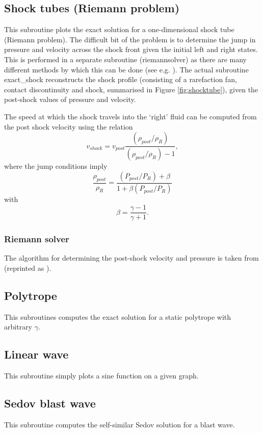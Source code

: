 \documentclass[a4paper,12pt]{article}
\begin{document}
\subsection{Shock tubes (Riemann problem)}
 This subroutine plots the exact solution for a one-dimensional shock tube
(Riemann problem). The difficult bit of the problem is to determine the jump in
pressure and velocity across the shock front given the initial left and right
states. This is performed in a separate subroutine (riemannsolver) as there are 
many different methods by which this can be done (see e.g. \citealt{toro92}). 
The actual subroutine exact\_shock reconstructs the shock profile (consisting of
a rarefaction fan, contact discontinuity and shock, summarised in Figure
\ref{fig:shocktube}), given the post-shock values of pressure and
velocity. 

 The speed at which the shock travels into the `right' fluid can be computed from the post shock
velocity using the relation
\begin{equation}
v_{shock} = v_{post}\frac{(\rho_{post}/\rho_R)}{(\rho_{post}/\rho_R)- 1},
\end{equation}
where the jump conditions imply
\begin{equation}
\frac{\rho_{post}}{\rho_R} = \frac{(P_{post}/P_R) + \beta}{1 + \beta (P_{post}/P_R)}
\end{equation}
with
\begin{equation}
\beta = \frac{\gamma - 1}{\gamma + 1}.
\end{equation}

\subsubsection{Riemann solver}
 The algorithm for determining the post-shock velocity and pressure is taken
from \citet{vanleer79} (reprinted as \citealt{vanleer99}).


\subsection{Polytrope}
 This subroutines computes the exact solution for a static polytrope with
arbitrary $\gamma$.

\subsection{Linear wave}
 This subroutine simply plots a sine function on a given graph.

\subsection{Sedov blast wave}
 This subroutine computes the self-similar Sedov solution for a blast wave.
\end{document}
